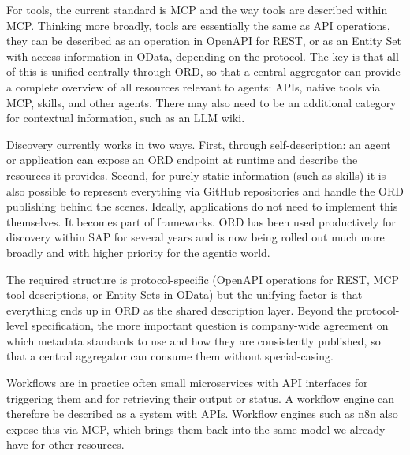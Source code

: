 For tools, the current standard is MCP and the way tools are described within MCP. Thinking more broadly, tools are essentially the same as API operations, they can be described as an operation in OpenAPI for REST, or as an Entity Set with access information in OData, depending on the protocol. The key is that all of this is unified centrally through ORD, so that a central aggregator can provide a complete overview of all resources relevant to agents: APIs, native tools via MCP, skills, and other agents. There may also need to be an additional category for contextual information, such as an LLM wiki.

\medskip{}

Discovery currently works in two ways. First, through self-description: an agent or application can expose an ORD endpoint at runtime and describe the resources it provides. Second, for purely static information (such as skills) it is also possible to represent everything via GitHub repositories and handle the ORD publishing behind the scenes. Ideally, applications do not need to implement this themselves. It becomes part of frameworks. ORD has been used productively for discovery within SAP for several years and is now being rolled out much more broadly and with higher priority for the agentic world.

\medskip{}

The required structure is protocol-specific (OpenAPI operations for REST, MCP tool descriptions, or Entity Sets in OData) but the unifying factor is that everything ends up in ORD as the shared description layer. Beyond the protocol-level specification, the more important question is company-wide agreement on which metadata standards to use and how they are consistently published, so that a central aggregator can consume them without special-casing.

\medskip{}

Workflows are in practice often small microservices with API interfaces for triggering them and for retrieving their output or status. A workflow engine can therefore be described as a system with APIs. Workflow engines such as n8n also expose this via MCP, which brings them back into the same model we already have for other resources.

